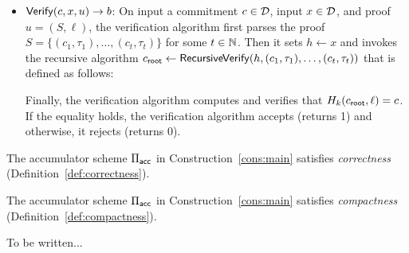 \begin{construction}
\begin{itemize}
    \item $\mathsf{Verify}(c, x, u) \to b$: On input a commitment $c \in \mathcal{D}$, input
      $x \in \mathcal{D}$, and proof $u = (S, \ell)$, the verification algorithm
      first parses the proof $S = \{ (c_1, \tau_1), \ldots, (c_t, \tau_t) \}$
      for some $t \in \mathbb{N}$. Then it sets $h \gets x$ and invokes the recursive
      algorithm $c_{\mathsf{root}} \gets \mathsf{RecursiveVerify}(h, (c_1, \tau_1), \ldots, (c_t,
      \tau_t))$ that is defined as follows:
      Finally, the verification algorithm computes and verifies that $H_k(c_{\mathsf{root}},
      \ell) = c$. If the equality holds, the verification algorithm accepts
      (returns 1) and otherwise, it rejects (returns 0).

  \end{itemize}
\end{construction}

\begin{theorem}[Correctness]
    The accumulator scheme $\Pi_{\mathsf{acc}}$ in Construction~\ref{cons:main} satisfies
    \emph{correctness} (Definition~\ref{def:correctness}).
\end{theorem}

\begin{theorem}[Compactness]
    The accumulator scheme $\Pi_{\mathsf{acc}}$ in Construction~\ref{cons:main} satisfies
    \emph{compactness} (Definition~\ref{def:compactness}).
\end{theorem}

\begin{theorem}[Soundness]
    To be written...
\end{theorem}
